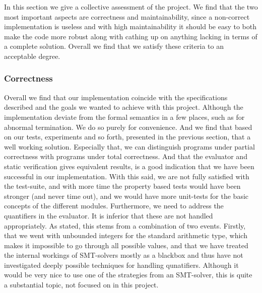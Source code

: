 In this section we give a collective assessment of the project.
We find that the two most important aspects are correctness and maintainability, since a non-correct implementation is useless and with high maintainability it should be easy to both make the code more robust along with cathing up on anything lacking in terms of a complete solution.
Overall we find that we satisfy these criteria to an acceptable degree.



\subsubsection{Correctness}
Overall we find that our implementation coincide with the specifications described and the goals we wanted to achieve with this project.
Although the implementation deviate from the formal semantics in a few places, such as for abnormal termination. We do so purely for convenience.
And we find that based on our tests, experiments and so forth, presented in the previous section, that a well working solution.
Especially that, we can distinguish programs under partial correctness with programs under total correctness. And that the evaluator and static verification gives equivalent results, is a good indication that we have been successful in our implementation.
With this said, we are not fully satisfied with the test-suite, and with more time the property based tests would have been stronger (and never time out), and we would have more unit-tests for the basic concepts of the different modules.
Furthermore, we need to address the quantifiers in the evaluator.
It is inferior that these are not handled appropriately.
As stated, this stems from a combination of two events.
Firstly, that we went with unbounded integers for the standard arithmetic type, which makes it impossible to go through all possible values, and that we have treated the internal workings of SMT-solvers mostly as a blackbox and thus have not investigated deeply possible techniques for handling qunatifiers. Although it would be very nice to use one of the strategies from an SMT-solver, this is quite a substantial topic, not focused on in this project.

